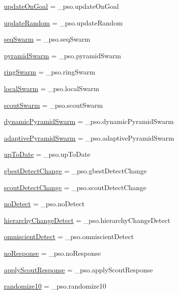 \begin{CompactItemize}
\item 
\hyperlink{namespacepso_c375f7d831876487d7c2ab48a6ee9350}{updateOnGoal} = \_\-pso.updateOnGoal
\item 
\hyperlink{namespacepso_311496d719ef15ca20374f9c91c7a812}{updateRandom} = \_\-pso.updateRandom
\item 
\hyperlink{namespacepso_958a3bcd6a80cc329bf7ee6ee063e7b9}{seqSwarm} = \_\-pso.seqSwarm
\item 
\hyperlink{namespacepso_dba1f2308456aa3d671f0d8688d0c978}{pyramidSwarm} = \_\-pso.pyramidSwarm
\item 
\hyperlink{namespacepso_4c3200e0d7da80e6f3c68930dc7fe617}{ringSwarm} = \_\-pso.ringSwarm
\item 
\hyperlink{namespacepso_9c6cdfe6aa5b7d0deb85d49088627ff2}{localSwarm} = \_\-pso.localSwarm
\item 
\hyperlink{namespacepso_7d6377e7aab4089240535661ed8b8436}{scoutSwarm} = \_\-pso.scoutSwarm
\item 
\hyperlink{namespacepso_94cf4a6b28e68d35bb6a50e03556baa7}{dynamicPyramidSwarm} = \_\-pso.dynamicPyramidSwarm
\item 
\hyperlink{namespacepso_77cce1553104d7778e5e362d0cb63ec3}{adaptivePyramidSwarm} = \_\-pso.adaptivePyramidSwarm
\item 
\hyperlink{namespacepso_95c63d6d8e2181f3dc0b9598a79e2fb0}{upToDate} = \_\-pso.upToDate
\item 
\hyperlink{namespacepso_f18f59b20d4081e64b956a3c8f29105e}{gbestDetectChange} = \_\-pso.gbestDetectChange
\item 
\hyperlink{namespacepso_a771471fd3e1fad40aab1b220d731a20}{scoutDetectChange} = \_\-pso.scoutDetectChange
\item 
\hyperlink{namespacepso_63d8c94d27a1b7f25a242b57aff4db7a}{noDetect} = \_\-pso.noDetect
\item 
\hyperlink{namespacepso_60e0f19620ff2a24b6d22562d73ebd1c}{hierarchyChangeDetect} = \_\-pso.hierarchyChangeDetect
\item 
\hyperlink{namespacepso_3106bad52a9716cf52ddb62db8035aa3}{omniscientDetect} = \_\-pso.omniscientDetect
\item 
\hyperlink{namespacepso_58d899f781247c69ee071e1117ded9b2}{noResponse} = \_\-pso.noResponse
\item 
\hyperlink{namespacepso_06f9b86a31322667701ec2ed75babf07}{applyScoutResponse} = \_\-pso.applyScoutResponse
\item 
\hyperlink{namespacepso_260382a7354d4ba0410e76449496c067}{randomize10} = \_\-pso.randomize10

\end{CompactItemize}
